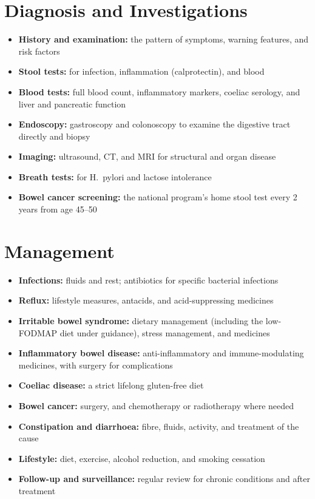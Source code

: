 \section*{Diagnosis and Investigations}
\begin{itemize}
    \item \textbf{History and examination:} the pattern of symptoms, warning features, and risk factors
    \item \textbf{Stool tests:} for infection, inflammation (calprotectin), and blood
    \item \textbf{Blood tests:} full blood count, inflammatory markers, coeliac serology, and liver and pancreatic function
    \item \textbf{Endoscopy:} gastroscopy and colonoscopy to examine the digestive tract directly and biopsy
    \item \textbf{Imaging:} ultrasound, CT, and MRI for structural and organ disease
    \item \textbf{Breath tests:} for H.\ pylori and lactose intolerance
    \item \textbf{Bowel cancer screening:} the national program's home stool test every 2 years from age 45--50
\end{itemize}

\section*{Management}
\begin{itemize}
    \item \textbf{Infections:} fluids and rest; antibiotics for specific bacterial infections
    \item \textbf{Reflux:} lifestyle measures, antacids, and acid-suppressing medicines
    \item \textbf{Irritable bowel syndrome:} dietary management (including the low-FODMAP diet under guidance), stress management, and medicines
    \item \textbf{Inflammatory bowel disease:} anti-inflammatory and immune-modulating medicines, with surgery for complications
    \item \textbf{Coeliac disease:} a strict lifelong gluten-free diet
    \item \textbf{Bowel cancer:} surgery, and chemotherapy or radiotherapy where needed
    \item \textbf{Constipation and diarrhoea:} fibre, fluids, activity, and treatment of the cause
    \item \textbf{Lifestyle:} diet, exercise, alcohol reduction, and smoking cessation
    \item \textbf{Follow-up and surveillance:} regular review for chronic conditions and after treatment
\end{itemize}

